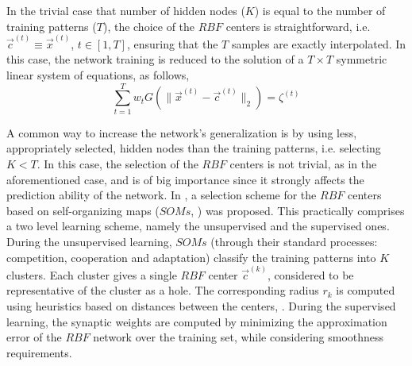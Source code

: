 In the trivial case that number of hidden nodes ($K$) is equal to the number of training patterns ($T$), the choice of the $RBF$ centers is straightforward, i.e.
$\vec{c}^{(t)}\!\equiv\!\vec{x}^{(t)}$, $t\!\in\![1,T]$, ensuring
that the $T$ samples are exactly interpolated. 
In this case, the network training is reduced to the solution of a $T\!\times\!T$ symmetric linear system of equations, as follows,
%
\begin{equation}
    \sum_{t=1}^{T} w_t G(\|\vec{x}^{(t)}-\vec{c}^{(t)}\|_2)=
    \zeta^{(t)}
    \nonumber
\end{equation}

A common way to increase the network's generalization \cite{Pog1990, Tik76, Tik95} is by using less, appropriately selected, hidden nodes than the training patterns, i.e. selecting $K\!<\!T$. 
In this case, the selection of the $RBF$ centers is not trivial, as in the aforementioned case, and is of big importance since 
it strongly affects the prediction ability of the network. 
In \cite{LTT_2_029}, a selection scheme for the $RBF$ centers based on 
self-organizing maps ($SOMs$, \cite{Fri94a, Hayk1999}) was proposed. 
This practically comprises a two level learning scheme, namely the unsupervised and the supervised ones.
During the unsupervised learning, $SOMs$ (through their standard processes: 
competition, cooperation and adaptation) classify the training 
patterns into $K$ clusters.  
Each cluster gives a single $RBF$ center $\vec{c}^{(k)}$, considered to be representative of the cluster as a hole. The corresponding radius $r_k$ is computed using heuristics based on distances between the centers, \cite{Karay1997, LTT_2_029, Hayk1999, BenArc02}.
During the supervised learning, the synaptic weights are computed by minimizing the approximation error of the $RBF$ network over the training set, while considering smoothness requirements.
%


